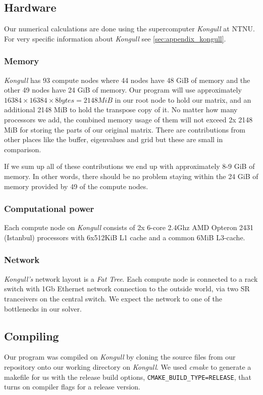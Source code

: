 \subsection{Hardware} %
\label{sub:hardware}
Our numerical calculations are done using the supercomputer \emph{Kongull} at NTNU. For very specific information about \emph{Kongull} see \ref{sec:appendix_kongull}. 

\subsubsection{Memory} %
\label{ssub:memory}
\emph{Kongull} has 93 compute nodes where 44 nodes have 48 GiB of memory and the other 49 nodes have 24 GiB of memory. Our program will use approximately $16384 \times 16384 \times 8 bytes = 2148 MiB$ in our root node to hold our matrix, and an additional 2148 MiB to hold the transpose copy of it. No matter how many processors we add, the combined memory usage of them will not exceed 2x 2148 MiB for storing the parts of our original matrix. There are contributions from other places like the buffer, eigenvalues and grid but these are small in comparison. 

If we sum up all of these contributions we end up with approximately 8-9 GiB of memory. In other words, there should be no problem staying within the 24 GiB of memory provided by 49 of the compute nodes. 

\subsubsection{Computational power} %
\label{ssub:subsubsection_name}
Each compute node on \emph{Kongull} consists of 2x 6-core 2.4Ghz AMD Opteron 2431 (Istanbul) processors with 6x512KiB L1 cache and a common 6MiB L3-cache. 

\subsubsection{Network} %
\label{ssub:network}
\emph{Kongull's} network layout is a \emph{Fat Tree}. Each compute node is connected to a rack switch with 1Gb Ethernet network connection to the outside world, via two SR tranceivers on the central switch. We expect the network to one of the bottlenecks in our solver. 

\subsection{Compiling} %
\label{sub:compiling}
Our program was compiled on \emph{Kongull} by cloning the source files from our  repository onto our working directory on \emph{Kongull}. We used \emph{cmake} to generate a makefile for us with the release build options, \texttt{CMAKE_BUILD_TYPE=RELEASE}, that turns on compiler flags for a release version. 

